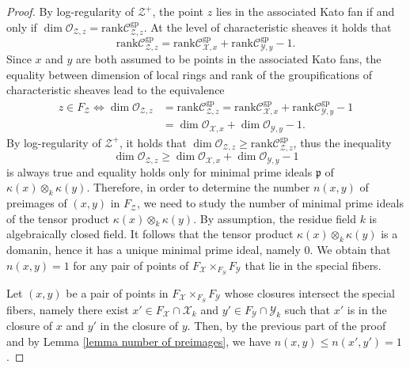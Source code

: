 \documentclass{amsart}%
\numberwithin{equation}{subsection}
\theoremstyle{plain2}
\theoremstyle{definition2}
\theoremstyle{stepstyle}
\theoremstyle{point}
\theoremstyle{subpoint}
\newcommand{\cX}{\ensuremath{\mathscr{X}}}
\newcommand{\fp}{\ensuremath{\mathfrak{p}}}
\newcommand{\caC}{\ensuremath{\mathcal{C}}}
\newcommand{\caO}{\ensuremath{\mathcal{O}}}
\newcommand{\cY}{\ensuremath{\mathscr{Y}}}
\newcommand{\cZ}{\ensuremath{\mathscr{Z}}}
\renewcommand{\cY}{\ensuremath{\mathscr{Y}}}
\newcommand{\Spec}{\ensuremath{\mathrm{Spec}\,}}
\newcommand{\rank}{\mathrm{rank}}
\begin{document}
\begin{proof}
By log-regularity of $\cZ^+$, the point $z$ lies in the associated Kato fan if and only if $\dim \caO_{\cZ,z}= \rank \caC_{\cZ,z}^{\text{gp}}$. At the level of characteristic sheaves it holds that $$\rank \caC_{\cZ,z}^{\text{gp}}= \rank \caC_{\cX,x}^{\text{gp}} + \rank \caC_{\cY,y}^{\text{gp}} - 1.$$ Since $x$ and $y$ are both assumed to be points in the associated Kato fans, the equality between dimension of local rings and rank of the groupifications of characteristic sheaves lead to the equivalence \begin{align*}
z \in F_{\cZ}  \Leftrightarrow \dim \caO_{\cZ,z} & = \rank \caC_{\cZ,z}^{\text{gp}} = \rank \caC_{\cX,x}^{\text{gp}} + \rank \caC_{\cY,y}^{\text{gp}} - 1 \\
& = \dim \caO_{\cX,x} +  \dim \caO_{\cY,y} -1.
\end{align*}
By log-regularity of $\cZ^+$, it holds that $\dim \caO_{\cZ,z} \geqslant \rank \caC_{\cZ,z}^{\text{gp}}$, thus the inequality $$\dim \caO_{\cZ,z} \geqslant \dim \caO_{\cX,x} +  \dim \caO_{\cY,y} -1$$ is always true and equality holds only for minimal prime ideals $\fp$ of $\kappa(x) \otimes_{k} \kappa(y)$. Therefore, in order to determine the number $n(x,y)$ of preimages of $(x,y)$ in $F_\cZ$, we need to study the number of minimal prime ideals of the tensor product $\kappa(x) \otimes_{k} \kappa(y)$. By assumption, the residue field $k$ is algebraically closed field. It follows that the tensor product $\kappa(x) \otimes_{k} \kappa(y)$ is a domanin, hence it has a unique minimal prime ideal, namely $0$. We obtain that $n(x,y)=1$ for any pair of points of $F_\cX \times_{F_S} F_\cY$ that lie in the special fibers.

Let $(x,y)$ be a pair of points in $F_\cX \times_{F_S} F_\cY$ whose closures intersect the special fibers, namely there exist $x' \in F_\cX \cap \cX_k$ and $y' \in F_\cY \cap \cY_k$ such that $x'$ is in the closure of $x$ and $y'$ in the closure of $y$. Then, by the previous part of the proof and by Lemma \ref{lemma number of preimages}, we have $n(x,y) \leqslant n(x',y') =1$. 
\end{proof}
\end{document}
